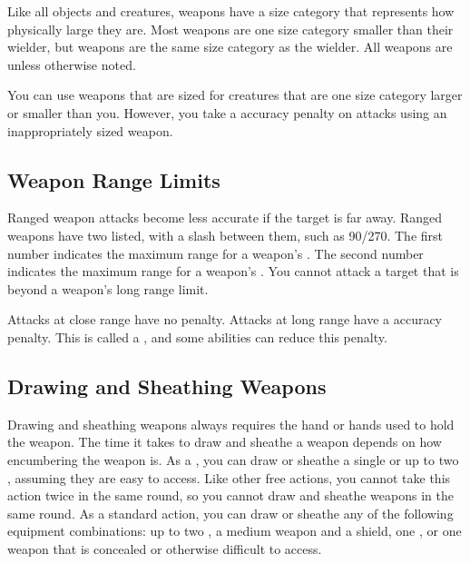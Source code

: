          Like all objects and creatures, weapons have a size category that represents how physically large they are. Most weapons are one size category smaller than their wielder, but  weapons are the same size category as the wielder.
        All weapons are  unless otherwise noted.

        \label{Inappropriately Sized Weapons} You can use weapons that are sized for creatures that are one size category larger or smaller than you.
        However, you take a  accuracy penalty on attacks using an inappropriately sized weapon.

    \subsection{Weapon Range Limits}\label{Weapon Range Limits}
        Ranged weapon attacks become less accurate if the target is far away.
        Ranged weapons have two  listed, with a slash between them, such as 90/270.
        The first number indicates the maximum range for a weapon's .
        The second number indicates the maximum range for a weapon's .
        You cannot attack a target that is beyond a weapon's long range limit.

        Attacks at close range have no penalty.
        Attacks at long range have a  accuracy penalty.
        This is called a , and some abilities can reduce this penalty.

    \subsection{Drawing and Sheathing Weapons}\label{Drawing and Sheathing Weapons}
        Drawing and sheathing weapons always requires the hand or hands used to hold the weapon.
        The time it takes to draw and sheathe a weapon depends on how encumbering the weapon is.
        As a , you can draw or sheathe a single  or up to two , assuming they are easy to access.
        Like other free actions, you cannot take this action twice in the same round, so you cannot draw and sheathe weapons in the same round.
        As a standard action, you can draw or sheathe any of the following equipment combinations: up to two , a medium weapon and a shield, one , or one weapon that is concealed or otherwise difficult to access.

